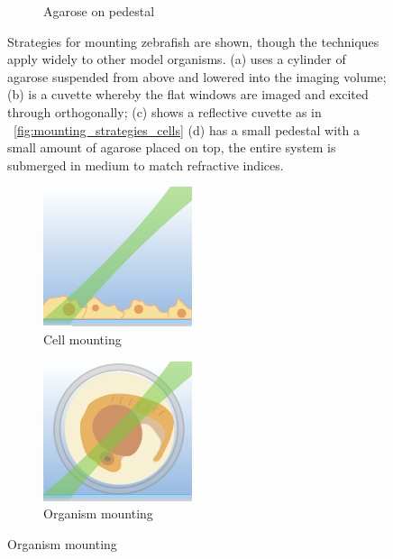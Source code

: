 \begin{figure}
\begin{subfigure}[b]{0.4\linewidth}
         \caption{Agarose on pedestal}
    \end{subfigure}
    \caption[Strategies for mounting \gls{zebrafish}]{Strategies for mounting \gls{zebrafish} are shown, though the techniques apply widely to other model organisms.
    (a) uses a cylinder of agarose suspended from above and lowered into the imaging volume;
    (b) is a cuvette whereby the flat windows are imaged and excited through orthogonally;
    (c) shows a reflective cuvette as in \figurename~\ref{fig:mounting_strategies_cells}
    (d) has a small pedestal with a small amount of agarose placed on top, the entire system is submerged in medium to match refractive indices.}\label{fig:mounting_strategies_fish_cartoon}
\end{figure}

\begin{figure}
    \centering
    \begin{subfigure}[t]{0.4\linewidth}
         \centering
        \includegraphics{edge_mount/cells}
         \caption{Cell mounting}\label{fig:edge_mount/cells}
    \end{subfigure}
    \begin{subfigure}[t]{0.4\linewidth}
             \centering
        \includegraphics{edge_mount/fish}
         \caption{Organism mounting}\label{fig:edge_mount/fish}
    \end{subfigure}

\end{figure}
